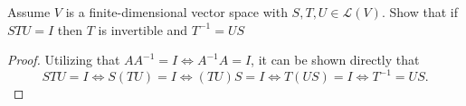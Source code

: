 Assume $V$ is a finite-dimensional vector space with $S,T,U \in \mathcal{L}(V)$.  Show that if $STU=I$ then $T$ is invertible and $T^{-1}= US$
\begin{mybox}
\begin{proof} Utilizing that $AA^{-1} = I \iff A^{-1}A = I$, it can be shown directly that
    $$STU = I \iff S(TU) = I \iff (TU)S = I \iff T(US) = I \iff T^{-1} = US.$$
\end{proof}
\end{mybox}